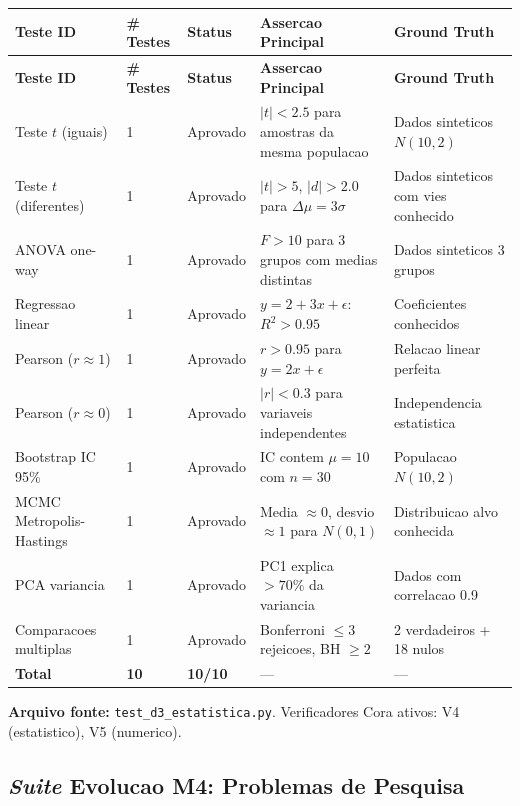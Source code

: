 \begin{longtable}{|p{2.5cm}|p{2.0cm}|p{2.0cm}|p{3.5cm}|p{3.5cm}|}
\hline
\textbf{Teste ID} & \textbf{\# Testes} & \textbf{Status} & \textbf{Assercao Principal} & \textbf{Ground Truth} \\
\hline
\endfirsthead
\hline
\textbf{Teste ID} & \textbf{\# Testes} & \textbf{Status} & \textbf{Assercao Principal} & \textbf{Ground Truth} \\
\hline
\endhead
\hline
\endfoot
Teste $t$ (iguais) & 1 & Aprovado & $|t|<2.5$ para amostras da mesma populacao & Dados sinteticos $N(10,2)$ \\
\hline
Teste $t$ (diferentes) & 1 & Aprovado & $|t|>5$, $|d|>2.0$ para $\Delta\mu=3\sigma$ & Dados sinteticos com vies conhecido \\
\hline
ANOVA one-way & 1 & Aprovado & $F>10$ para 3 grupos com medias distintas & Dados sinteticos 3 grupos \\
\hline
Regressao linear & 1 & Aprovado & $y=2+3x+\epsilon$: $R^{2}>0.95$ & Coeficientes conhecidos \\
\hline
Pearson ($r\approx 1$) & 1 & Aprovado & $r>0.95$ para $y=2x+\epsilon$ & Relacao linear perfeita \\
\hline
Pearson ($r\approx 0$) & 1 & Aprovado & $|r|<0.3$ para variaveis independentes & Independencia estatistica \\
\hline
Bootstrap IC 95\% & 1 & Aprovado & IC contem $\mu=10$ com $n=30$ & Populacao $N(10,2)$ \\
\hline
MCMC Metropolis-Hastings & 1 & Aprovado & Media $\approx 0$, desvio $\approx 1$ para $N(0,1)$ & Distribuicao alvo conhecida \\
\hline
PCA variancia & 1 & Aprovado & PC1 explica $>70\%$ da variancia & Dados com correlacao 0.9 \\
\hline
Comparacoes multiplas & 1 & Aprovado & Bonferroni $\leq 3$ rejeicoes, BH $\geq 2$ & 2 verdadeiros + 18 nulos \\
\hline
\textbf{Total} & \textbf{10} & \textbf{10/10} & --- & --- \\
\hline
\end{longtable}

\textbf{Arquivo fonte:} \texttt{test\_d3\_estatistica.py}. Verificadores Cora ativos: V4 (estatistico), V5 (numerico).

\subsection{\textit{Suite} Evolucao M4: Problemas de Pesquisa}

